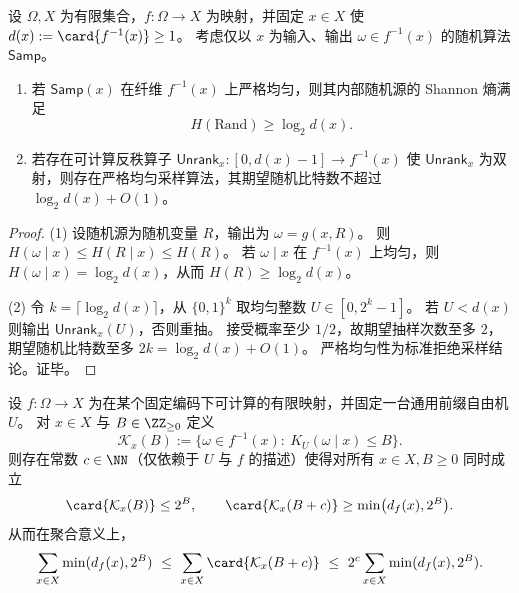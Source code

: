 \begin{proposition}[纤维均匀采样的随机性复杂度与反秩构造]\label{prop:pom-uniform-fiber-sampling-randomness-optimality}
设 \(\Omega,X\) 为有限集合，\(f:\Omega\to X\) 为映射，并固定 \(x\in X\) 使 \(d(x):=\card{f^{-1}(x)}\ge 1\)。
考虑仅以 \(x\) 为输入、输出 \(\omega\in f^{-1}(x)\) 的随机算法 \(\mathsf{Samp}\)。
\begin{enumerate}
\normalfont
  \item 若 \(\mathsf{Samp}(x)\) 在纤维 \(f^{-1}(x)\) 上严格均匀，则其内部随机源的 Shannon 熵满足
  \[
  H(\mathrm{Rand})\ge \log_2 d(x).
  \]
  \item 若存在可计算反秩算子 \(\mathsf{Unrank}_x:[0,d(x)-1]\to f^{-1}(x)\) 使 \(\mathsf{Unrank}_x\) 为双射，则存在严格均匀采样算法，其期望随机比特数不超过 \(\log_2 d(x)+O(1)\)。
\end{enumerate}
\end{proposition}
\begin{proof}
(1) 设随机源为随机变量 \(R\)，输出为 \(\omega=g(x,R)\)。
则 \(H(\omega\mid x)\le H(R\mid x)\le H(R)\)。
若 \(\omega\mid x\) 在 \(f^{-1}(x)\) 上均匀，则 \(H(\omega\mid x)=\log_2 d(x)\)，从而 \(H(R)\ge \log_2 d(x)\)。
\par
(2) 令 \(k=\lceil\log_2 d(x)\rceil\)，从 \(\{0,1\}^k\) 取均匀整数 \(U\in[0,2^k-1]\)。
若 \(U<d(x)\) 则输出 \(\mathsf{Unrank}_x(U)\)，否则重抽。
接受概率至少 \(1/2\)，故期望抽样次数至多 \(2\)，期望随机比特数至多 \(2k=\log_2 d(x)+O(1)\)。
严格均匀性为标准拒绝采样结论。证毕。
\end{proof}

\begin{theorem}\label{thm:pom-oracle-capacity-kolmogorov-spectrum}
设 \(f:\Omega\to X\) 为在某个固定编码下可计算的有限映射，并固定一台通用前缀自由机 \(U\)。
对 \(x\in X\) 与 \(B\in\ZZ_{\ge 0}\) 定义
\[
\mathcal K_x(B):=\{\omega\in f^{-1}(x):\ K_U(\omega\mid x)\le B\}.
\]
则存在常数 \(c\in\NN\)（仅依赖于 \(U\) 与 \(f\) 的描述）使得对所有 \(x\in X,B\ge 0\) 同时成立
\[
\card{\mathcal K_x(B)}\le 2^B,
\qquad
\card{\mathcal K_x(B+c)}\ge \min\bigl(d_f(x),2^B\bigr).
\]
从而在聚合意义上，
\[
\sum_{x\in X}\min(d_f(x),2^B)
\ \le\
\sum_{x\in X}\card{\mathcal K_x(B+c)}
\ \le\
2^c\sum_{x\in X}\min(d_f(x),2^B).
\]
\end{theorem}

